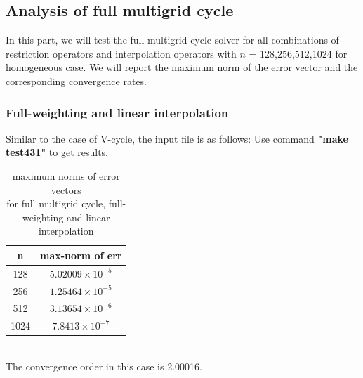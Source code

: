 \documentclass[a4paper,twocolumn]{article}
\theoremstyle{definition}
\begin{document}
\subsection{Analysis of full multigrid cycle}
In this part, we will test the full multigrid cycle solver for all combinations of restriction operators and interpolation operators with $n$ = 128,256,512,1024 for homogeneous case. We will report the maximum norm of the error vector and the corresponding convergence rates.
\subsubsection{Full-weighting and linear interpolation}
Similar to the case of V-cycle, the input file is as follows:
\newpage
\noindent Use command \textbf{"make test431"} to get results. 
\begin{table}[!htp]
	\centering
	\begin{tabular}{|c|c|}
		\hline	
		n  & max-norm of err \\
		\hline		
		128 & $5.02009\times 10^{-5}$ \\
		\hline		
		256 & $1.25464\times 10^{-5}$ \\
		\hline		
		512 & $3.13654\times 10^{-6}$ \\
		\hline		
		1024 & $7.8413\times 10^{-7}$ \\
		\hline
	\end{tabular}
	\caption{maximum norms of error vectors \\for full multigrid cycle, full-weighting and linear interpolation}
\end{table}\\
The convergence order in this case is 2.00016.
\end{document}
